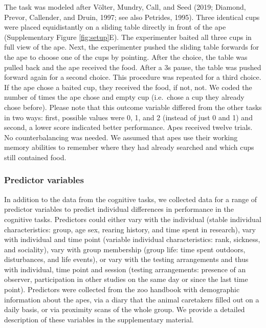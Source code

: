 \documentclass[
  man,floatsintext]{apa6}
\begin{document}
The task was modeled after Völter, Mundry, Call, and Seed (2019; Diamond, Prevor, Callender, and Druin, 1997; see also Petrides, 1995). Three identical cups were placed equidistantly on a sliding table directly in front of the ape (Supplementary Figure \ref{fig:setup}E). The experimenter baited all three cups in full view of the ape. Next, the experimenter pushed the sliding table forwards for the ape to choose one of the cups by pointing. After the choice, the table was pulled back and the ape received the food. After a 3s pause, the table was pushed forward again for a second choice. This procedure was repeated for a third choice. If the ape chose a baited cup, they received the food, if not, not. We coded the number of times the ape chose and empty cup (i.e.~chose a cup they already chose before). Please note that this outcome variable differed from the other tasks in two ways: first, possible values were 0, 1, and 2 (instead of just 0 and 1) and second, a lower score indicated better performance. Apes received twelve trials. No counterbalancing was needed. We assumed that apes use their working memory abilities to remember where they had already searched and which cups still contained food.

\hypertarget{predictor-variables}{%
\subsubsection{Predictor variables}\label{predictor-variables}}

In addition to the data from the cognitive tasks, we collected data for a range of predictor variables to predict individual differences in performance in the cognitive tasks. Predictors could either vary with the individual (stable individual characteristics: group, age sex, rearing history, and time spent in research), vary with individual and time point (variable individual characteristics: rank, sickness, and sociality), vary with group membership (group life: time spent outdoors, disturbances, and life events), or vary with the testing arrangements and thus with individual, time point and session (testing arrangements: presence of an observer, participation in other studies on the same day or since the last time point). Predictors were collected from the zoo handbook with demographic information about the apes, via a diary that the animal caretakers filled out on a daily basis, or via proximity scans of the whole group. We provide a detailed description of these variables in the supplementary material.
\end{document}
